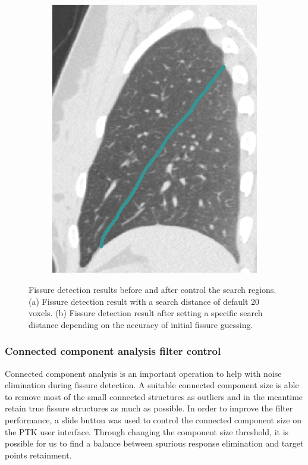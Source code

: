 {\begin{figure}[htbp]
\begin{subfigure}{.33\linewidth}
  \includegraphics[width=\linewidth,trim={{.0\wd0} {.0\wd0} {.0\wd0} {.0\wd0}},clip]{Segmentation/Image/AfterChangeSearchRegion.png}
  \caption{}
  \label{fig:SearchRegionControl-b} 
\end{subfigure}
\caption{Fissure detection results before and after control the search regions. (a) Fissure detection result with a search distance of default 20 voxels. (b) Fissure detection result after setting a specific search distance depending on the accuracy of initial fissure guessing.}
\label{fig:SearchRegionControl}
\end{figure}

\subsubsection{Connected component analysis filter control}
Connected component analysis is an important operation to help with noise elimination during fissure detection. A suitable connected component size is able to remove most of the small connected structures as outliers and in the meantime retain true fissure structures as much as possible. In order to improve the filter performance, a slide button was used to control the connected component size on the PTK user interface. Through changing the component size threshold, it is possible for us to find a balance between spurious response elimination and target points retainment. 

}
